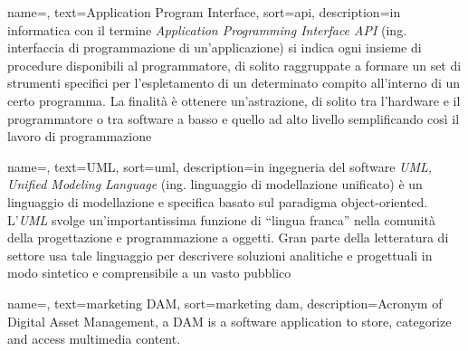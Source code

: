 \renewcommand{\acronymname}{Acronimi e abbreviazioni}







{
    name=,
    text=Application Program Interface,
    sort=api,
    description={in informatica con il termine \emph{Application Programming Interface API} (ing. interfaccia di programmazione di un'applicazione) si indica ogni insieme di procedure disponibili al programmatore, di solito raggruppate a formare un set di strumenti specifici per l'espletamento di un determinato compito all'interno di un certo programma. La finalità è ottenere un'astrazione, di solito tra l'hardware e il programmatore o tra software a basso e quello ad alto livello semplificando così il lavoro di programmazione}
}

{
    name=,
    text=UML,
    sort=uml,
    description={in ingegneria del software \emph{UML, Unified Modeling Language} (ing. linguaggio di modellazione unificato) è un linguaggio di modellazione e specifica basato sul paradigma object-oriented. L'\emph{UML} svolge un'importantissima funzione di ``lingua franca'' nella comunità della progettazione e programmazione a oggetti. Gran parte della letteratura di settore usa tale linguaggio per descrivere soluzioni analitiche e progettuali in modo sintetico e comprensibile a un vasto pubblico}
}

{
	name=,
	text=marketing DAM,
	sort=marketing dam,
	description={Acronym of Digital Asset Management, a DAM is a software application to store, categorize and access multimedia content.}
}

